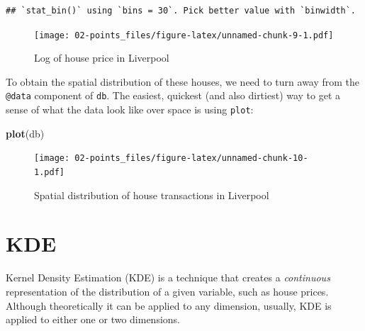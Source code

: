 \documentclass[]{book}
\newenvironment{Shaded}{\begin{snugshade}}{\end{snugshade}}
\newcommand{\KeywordTok}[1]{\textcolor[rgb]{0.13,0.29,0.53}{\textbf{#1}}}
\newcommand{\DataTypeTok}[1]{\textcolor[rgb]{0.13,0.29,0.53}{#1}}
\newcommand{\StringTok}[1]{\textcolor[rgb]{0.31,0.60,0.02}{#1}}
\newcommand{\CommentTok}[1]{\textcolor[rgb]{0.56,0.35,0.01}{\textit{#1}}}
\newcommand{\OperatorTok}[1]{\textcolor[rgb]{0.81,0.36,0.00}{\textbf{#1}}}
\newcommand{\NormalTok}[1]{#1}
\begin{document}
\begin{Shaded}
\end{Shaded}

\begin{verbatim}
## `stat_bin()` using `bins = 30`. Pick better value with `binwidth`.
\end{verbatim}

\begin{figure}
\centering
\texttt{[image: 02-points\_files/figure-latex/unnamed-chunk-9-1.pdf]}
\caption{\label{fig:unnamed-chunk-9}Log of house price in Liverpool}
\end{figure}

To obtain the spatial distribution of these houses, we need to turn away
from the \texttt{@data} component of \texttt{db}. The easiest, quickest
(and also dirtiest) way to get a sense of what the data look like over
space is using \texttt{plot}:

\begin{Shaded}
\begin{Highlighting}[]
\KeywordTok{plot}\NormalTok{(db)}
\end{Highlighting}
\end{Shaded}

\begin{figure}
\centering
\texttt{[image: 02-points\_files/figure-latex/unnamed-chunk-10-1.pdf]}
\caption{\label{fig:unnamed-chunk-10}Spatial distribution of house
transactions in Liverpool}
\end{figure}

\section{KDE}\label{kde}

Kernel Density Estimation (KDE) is a technique that creates a
\emph{continuous} representation of the distribution of a given
variable, such as house prices. Although theoretically it can be applied
to any dimension, usually, KDE is applied to either one or two
dimensions.
\end{document}
